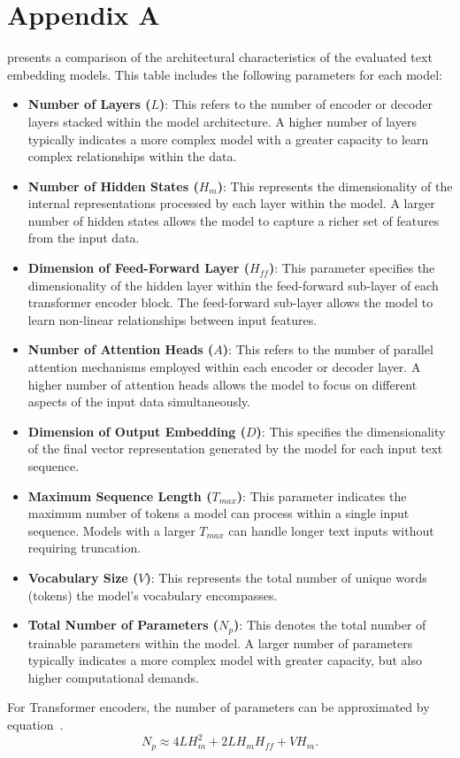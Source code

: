
\chapter{Appendix A} \label{chap:appendix_A}

 presents a comparison of the architectural characteristics of the evaluated text embedding models.
This table includes the following parameters for each model:

\begin{itemize}
  \item \textbf{Number of Layers ($L$)}:
    This refers to the number of encoder or decoder layers stacked within the model architecture.
    A higher number of layers typically indicates a more complex model with a greater capacity to learn complex relationships within the data.
  \item \textbf{Number of Hidden States ($H_m$)}:
    This represents the dimensionality of the internal representations processed by each layer within the model.
    A larger number of hidden states allows the model to capture a richer set of features from the input data.
  \item \textbf{Dimension of Feed-Forward Layer ($H_{ff}$)}:
    This parameter specifies the dimensionality of the hidden layer within the feed-forward sub-layer of each transformer encoder block.
    The feed-forward sub-layer allows the model to learn non-linear relationships between input features.
  \item \textbf{Number of Attention Heads ($A$)}:
    This refers to the number of parallel attention mechanisms employed within each encoder or decoder layer.
    A higher number of attention heads allows the model to focus on different aspects of the input data simultaneously.
  \item \textbf{Dimension of Output Embedding ($D$)}:
    This specifies the dimensionality of the final vector representation generated by the model for each input text sequence.
  \item \textbf{Maximum Sequence Length ($T_{max}$)}:
    This parameter indicates the maximum number of tokens a model can process within a single input sequence.
    Models with a larger $T_{max}$ can handle longer text inputs without requiring truncation.
  \item \textbf{Vocabulary Size ($V$)}:
    This represents the total number of unique words (tokens) the model's vocabulary encompasses.
  \item \textbf{Total Number of Parameters ($N_p$)}:
    This denotes the total number of trainable parameters within the model.
    A larger number of parameters typically indicates a more complex model with greater capacity, but also higher computational demands.
\end{itemize}


For Transformer encoders, the number of parameters can be approximated by equation~.
\begin{equation}
  \label{eq:model_params}
  N_p \approx 4LH_m^2 + 2LH_m H_{ff} + VH_m.
\end{equation}


